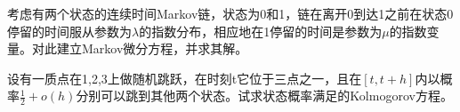 \begin{Exercises}
	\item 考虑有两个状态的连续时间Markov链，状态为0和1，链在离开0到达1之前在状态0停留的时间服从参数为\(\lambda\)的指数分布，相应地在1停留的时间是参数为\(\mu\)的指数变量。对此建立Markov微分方程，并求其解。
	\vspace{15em}
	\item 设有一质点在1,2,3上做随机跳跃，在时刻t它位于三点之一，且在\([t,t+h]\)内以概率\(\frac{1}{2}+o(h)\)分别可以跳到其他两个状态。试求状态概率满足的Kolmogorov方程。
\end{Exercises}
